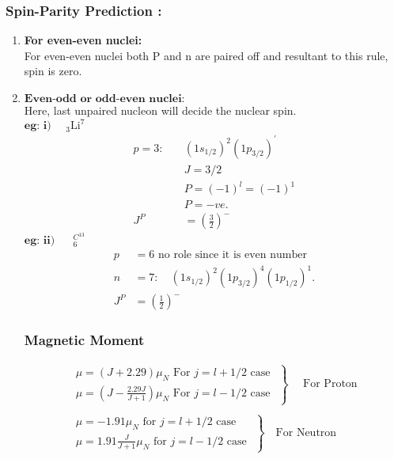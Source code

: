 \subsubsection{Spin-Parity Prediction :}
\begin{enumerate}[label=\alph*)]
	\item \textbf{For even-even nuclei:}\\ For even-even nuclei both P and n are paired off and resultant to this rule, spin is zero.
	\item $\textbf{Even-odd or odd-even nuclei:}$\\
	Here, last unpaired nucleon will decide the nuclear spin.\\
	$\textbf{eg: i) }\quad $${ }_{3} \mathrm{Li}^{7}$
	\begin{align*}
p=3: \quad&\left(1 s_{1 / 2}\right)^{2}\left(1 p_{3 / 2}\right)^{\prime}\\
	&J=3 / 2 \\
	&P=(-1)^{l}=(-1)^{1} \\
	&P=-v e .\\
J^{P}&=\left(\frac{3}{2}\right)^{-}
	\end{align*}
$\textbf{eg: ii) }\quad$ ${ }_{6}^{C^{13}}$
\begin{align*}
p&=6 \text { no role since it is even number }\\
n&=7: \quad\left(1 s_{1 / 2}\right)^{2}\left(1 p_{3 / 2}\right)^{4}\left(1 p_{1 / 2}\right)^{1} .\\
J^{P}&=\left(\frac{1}{2}\right)^{-}
\end{align*}
\subsubsection{Magnetic Moment }
\begin{align*}
\left.\begin{array}{r}
\mu=(J+2.29) \mu_{N} \text { For } j=l+1 / 2 \text { case } \\
\mu=\left(J-\frac{2.29J}{J+1}\right) \mu_{N} \text { For } j=l-1 / 2 \text { case }
\end{array}\right\}
\quad\text{ For Proton}\\\\
\left.\begin{array}{l}
\mu=-1.91 \mu_{N} \text { for }j= l+1 / 2 \text { case } \\
\mu= 1.91 \frac{J}{J+1} \mu_{N} \text { for } j=l-1 / 2 \text { case }
\end{array}\right\}\quad \text{For Neutron}
\end{align*}
\end{enumerate}
